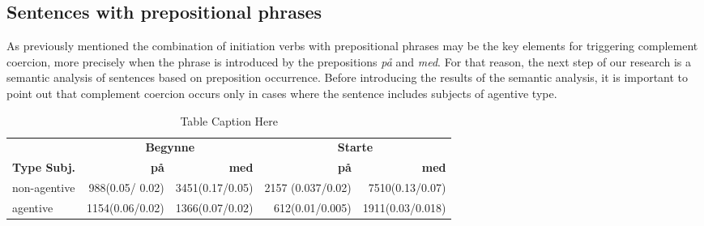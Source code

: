 \documentclass{article}
\begin{document}
\subsection{Sentences with prepositional phrases}
As previously mentioned the combination of initiation verbs with prepositional phrases may be the key elements for triggering complement coercion, more precisely when the phrase is introduced by the prepositions \emph{på} and \emph{med}. %
For that reason, the next step of our research is a semantic analysis of sentences based on preposition occurrence. 
Before introducing the results of the semantic analysis, it is important to point out that complement coercion occurs only in cases where the sentence includes subjects of agentive type.
\begin{table}[!]
    \centering
    \begin{tabular}{lrrrr}
        \toprule
        & \multicolumn{2}{c}{\textbf{Begynne}} & \multicolumn{2}{c}{\textbf{Starte}} \\
        \cmidrule(lr){2-3} \cmidrule(lr){4-5}
        \textbf{Type Subj.} & \textbf{på} & \textbf{med} & \textbf{på} & \textbf{med} \\
        \midrule
        non-agentive &   988(0.05/ 0.02) & 3451(0.17/0.05) & 2157	(0.037/0.02) & 7510(0.13/0.07)\\
        agentive      &  1154(0.06/0.02) & 1366(0.07/0.02)  & 612(0.01/0.005) &  1911(0.03/0.018) \\
        \bottomrule
    \end{tabular}
    \caption{Table Caption Here}
    \label{tab:initiation_verbs_agentive_no_agentive}
\end{table}
\end{document}
